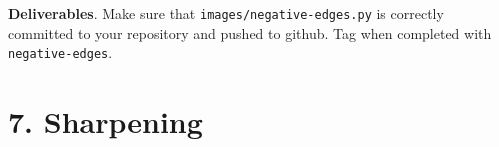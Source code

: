 \begin{minipage}{\linewidth}
\end{minipage}

\begin{callout}{\bcplume}
{\bf Deliverables}. Make sure that {\tt images/negative-edges.py} is correctly committed to your repository and pushed to github. Tag when completed with {\tt negative-edges}.
\end{callout}

\section{7. Sharpening}

